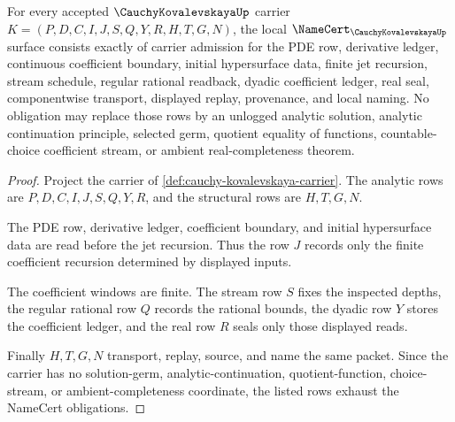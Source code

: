 \begin{theorem}
\label{thm:cauchy-kovalevskaya-namecert-obligations}
For every accepted $\CauchyKovalevskayaUp$ carrier $K=(P,D,C,I,J,S,Q,Y,R,H,T,G,N)$, the local $\NameCert_{\CauchyKovalevskayaUp}$ surface consists exactly of carrier admission for the PDE row, derivative ledger, continuous coefficient boundary, initial hypersurface data, finite jet recursion, stream schedule, regular rational readback, dyadic coefficient ledger, real seal, componentwise transport, displayed replay, provenance, and local naming. No obligation may replace those rows by an unlogged analytic solution, analytic continuation principle, selected germ, quotient equality of functions, countable-choice coefficient stream, or ambient real-completeness theorem.
\end{theorem}
\begin{proof}
Project the carrier of \autoref{def:cauchy-kovalevskaya-carrier}. The analytic rows are $P,D,C,I,J,S,Q,Y,R$, and the structural rows are $H,T,G,N$.

The PDE row, derivative ledger, coefficient boundary, and initial hypersurface data are read before the jet recursion. Thus the row $J$ records only the finite coefficient recursion determined by displayed inputs.

The coefficient windows are finite. The stream row $S$ fixes the inspected depths, the regular rational row $Q$ records the rational bounds, the dyadic row $Y$ stores the coefficient ledger, and the real row $R$ seals only those displayed reads.

Finally $H,T,G,N$ transport, replay, source, and name the same packet. Since the carrier has no solution-germ, analytic-continuation, quotient-function, choice-stream, or ambient-completeness coordinate, the listed rows exhaust the NameCert obligations.
\end{proof}

